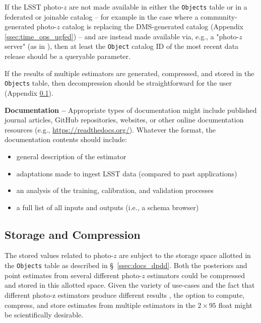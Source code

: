 \documentclass[DM,lsstdraft,toc]{lsstdoc}
\begin{document}
If the LSST photo-$z$ are not made available in either the {\tt Objects} table or in a federated or joinable catalog -- for example in the case where a community-generated photo-$z$ catalog is replacing the DMS-generated catalog (Appendix \ref{ssec:time_ops_ugfed}) -- and are instead made available via, e.g., a "photo-$z$ server" (as in \cite{2018A&C....25...58G}), then at least the {\tt Object} catalog ID of the most recent data release should be a queryable parameter.

If the results of multiple estimators are generated, compressed, and stored in the {\tt Objects} table, then decompression should be straightforward for the user (Appendix \ref{ssec:dp_store}).

{\bf Documentation --} 
Appropriate types of documentation might include published journal articles, GitHub repositories, websites, or other online documentation resources (e.g., \url{https://readthedocs.org/}). Whatever the format, the documentation contents should include: 
\vspace{-15pt}
\begin{itemize}
\item general description of the estimator
\item adaptations made to ingest LSST data (compared to past applications)
\item an analysis of the training, calibration, and validation processes
\item a full list of all inputs and outputs (i.e., a schema browser)
\end{itemize}

\subsection{Storage and Compression}\label{ssec:dp_store}

The stored values related to photo-$z$ are subject to the storage space allotted in the {\tt Objects} table as described in \S~\ref{ssec:docs_dpdd}.
Both the posteriors and point estimates from several different photo-$z$ estimators could be compressed and stored in this allotted space.
Given the variety of use-cases and the fact that different photo-z estimators produce different results \citep{2020arXiv200103621S}, the option to compute, compress, and store estimates from multiple estimators in the $2\times95$ float might be scientifically desirable.
\end{document}

